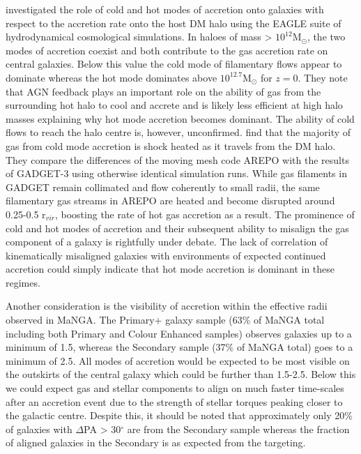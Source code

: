 \citet{correa2018} investigated the role of cold and hot modes of accretion onto galaxies with respect to the accretion rate onto the host DM halo using the EAGLE suite of hydrodynamical cosmological simulations. In haloes of mass > $\mathrm{10^{12}M_{\odot}}$, the two modes of accretion coexist and both contribute to the gas accretion rate on central galaxies. Below this value the cold mode of filamentary flows appear to dominate whereas the hot mode dominates above $\mathrm{10^{12.7}M_{\odot}}$ for $z = 0$.  They note that AGN feedback plays an important role on the ability of gas from the surrounding hot halo to cool and accrete and is likely less efficient at high halo masses explaining why hot mode accretion becomes dominant. The ability of cold flows to reach the halo centre is, however, unconfirmed. \citet{nelson2013} find that the majority of gas from cold mode accretion is shock heated as it travels from the DM halo. They compare the differences of the moving mesh code AREPO with the results of GADGET-3 using otherwise identical simulation runs. While gas filaments in GADGET remain collimated and flow coherently to small radii, the same filamentary gas streams in AREPO are heated and become disrupted around  0.25-0.5 r$_{vir}$, boosting the rate of hot gas accretion as a result. The prominence of cold and hot modes of accretion and their subsequent ability to misalign the gas component of a galaxy is rightfully under debate. The lack of correlation of kinematically misaligned galaxies with environments of expected continued accretion could simply indicate that hot mode accretion is dominant in these regimes. 

Another consideration is the visibility of accretion within the effective radii observed in MaNGA. The Primary+ galaxy sample (63\% of MaNGA total including both Primary and Colour Enhanced samples) observes galaxies up to a minimum of 1.5\re, whereas the Secondary sample (37\% of MaNGA total) goes to a minimum of 2.5\re. All modes of accretion would be expected to be most visible on the outskirts of the central galaxy which could be further than 1.5-2.5\re. Below this we could expect gas and stellar components to align on much faster time-scales after an accretion event due to the strength of stellar torques peaking closer to the galactic centre. Despite this, it should be noted that approximately only 20\% of galaxies with $\Delta$PA > 30$^{\circ}$ are from the Secondary sample whereas the fraction of aligned galaxies in the Secondary is as expected from the targeting. 

